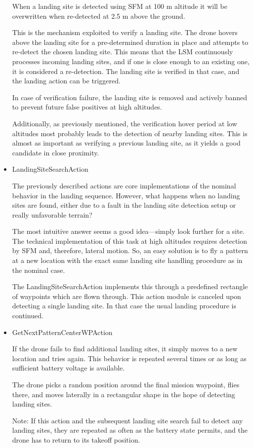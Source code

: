\begin{itemize}
    When a landing site is detected using SFM at 100 m altitude it will be overwritten when re-detected at 2.5 m above the ground. 

    This is the mechanism exploited to verify a landing site. The drone hovers above the landing site for a pre-determined duration in place and attempts to re-detect the chosen landing site. This means that the LSM continuously processes incoming landing sites, and if one is close enough to an existing one, it is considered a re-detection. The landing site is verified in that case, and the landing action can be triggered.

    In case of verification failure, the landing site is removed and actively banned to prevent future false positives at high altitudes.

    Additionally, as previously mentioned, the verification hover period at low altitudes most probably leads to the detection of nearby landing sites. This is almost as important as verifying a previous landing site, as it yields a good candidate in close proximity. 
    \item LandingSiteSearchAction

    The previously described actions are core implementations of the nominal behavior in the landing sequence. However, what happens when no landing sites are found, either due to a fault in the landing site detection setup or really unfavorable terrain?

    The most intuitive answer seems a good idea—simply look further for a site. The technical implementation of this task at high altitudes requires detection by SFM and, therefore, lateral motion. So, an easy solution is to fly a pattern at a new location with the exact same landing site handling procedure as in the nominal case.

    The LandingSiteSearchAction implements this through a predefined rectangle of waypoints which are flown through. This action module is canceled upon detecting a single landing site. In that case the usual landing procedure is continued.
    \item GetNextPatternCenterWPAction

    If the drone fails to find additional landing sites, it simply moves to a new location and tries again. This behavior is repeated several times or as long as sufficient battery voltage is available.

    The drone picks a random position around the final mission waypoint, flies there, and moves laterally in a rectangular shape in the hope of detecting landing sites.

    Note: If this action and the subsequent landing site search fail to detect any landing sites, they are repeated as often as the battery state permits, and the drone has to return to its takeoff position.
    \end{itemize}

